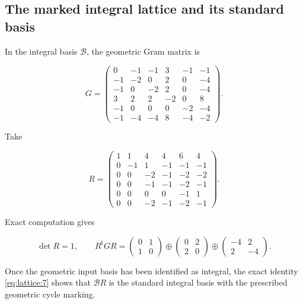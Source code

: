 \documentclass[11pt,a4paper,oneside]{article}
\theoremstyle{plain}
\theoremstyle{definition}
\theoremstyle{remark}
\numberwithin{equation}{section}
\begin{document}
\subsection{The marked integral lattice and its standard basis}\label{sec:lattice:4}

In the integral basis \(\mathcal B\), the geometric Gram matrix is

\begin{equation}
G=
\begin{pmatrix}
0&-1&-1&3&-1&-1\\
-1&-2&0&2&0&-4\\
-1&0&-2&2&0&-4\\
3&2&2&-2&0&8\\
-1&0&0&0&-2&-4\\
-1&-4&-4&8&-4&-2
\end{pmatrix}.                                                   \label{eq:lattice:6}
\end{equation}

Take

\begin{equation}
R=\begin{pmatrix}
1&1&4&4&6&4\\
0&-1&1&-1&-1&-1\\
0&0&-2&-1&-2&-2\\
0&0&-1&-1&-2&-1\\
0&0&0&0&-1&1\\
0&0&-2&-1&-2&-1
\end{pmatrix}.
\end{equation}

Exact computation gives

\begin{equation}
\det R=1,\qquad
 R^{\mathsf t}GR=
 \begin{pmatrix}0&1\\1&0\end{pmatrix}
 \oplus\begin{pmatrix}0&2\\2&0\end{pmatrix}
 \oplus\begin{pmatrix}-4&2\\2&-4\end{pmatrix}.                       \label{eq:lattice:7}
\end{equation}

Once the geometric input basis has been identified as integral, the exact identity \eqref{eq:lattice:7} shows that \(\mathcal B R\) is the standard integral basis with the prescribed geometric cycle marking.
\end{document}
